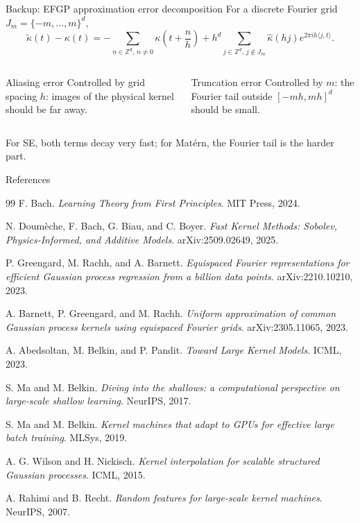 \documentclass[aspectratio=169,11pt]{ctexbeamer}
\begin{document}
\begin{frame}{Backup: EFGP approximation error decomposition}
\small
For a discrete Fourier grid $J_m=\{-m,\ldots,m\}^d$,
\[
\widetilde\kappa(t)-\kappa(t)=
-\sum_{n\in\mathbb{Z}^d,\,n\ne0}\kappa\left(t+\frac{n}{h}\right)
+ h^d\sum_{j\in\mathbb{Z}^d,\,j\notin J_m}\widehat\kappa(hj)e^{2\pi ih\langle j,t\rangle}.
\]
\begin{columns}[T,onlytextwidth]
\begin{block}{Aliasing error}
Controlled by grid spacing $h$: images of the physical kernel should be far away.
\end{block}
\begin{block}{Truncation error}
Controlled by $m$: the Fourier tail outside $[-mh,mh]^d$ should be small.
\end{block}
\end{columns}
\vspace{0.25cm}
\small For SE, both terms decay very fast; for Mat\'ern, the Fourier tail is the harder part.
\end{frame}

\begin{frame}[allowframebreaks]{References}
\tiny
\begin{thebibliography}{99}
F. Bach. \emph{Learning Theory from First Principles}. MIT Press, 2024.

N. Doum\`eche, F. Bach, G. Biau, and C. Boyer. \emph{Fast Kernel Methods: Sobolev, Physics-Informed, and Additive Models}. arXiv:2509.02649, 2025.

P. Greengard, M. Rachh, and A. Barnett. \emph{Equispaced Fourier representations for efficient Gaussian process regression from a billion data points}. arXiv:2210.10210, 2023.

A. Barnett, P. Greengard, and M. Rachh. \emph{Uniform approximation of common Gaussian process kernels using equispaced Fourier grids}. arXiv:2305.11065, 2023.

A. Abedsoltan, M. Belkin, and P. Pandit. \emph{Toward Large Kernel Models}. ICML, 2023.

S. Ma and M. Belkin. \emph{Diving into the shallows: a computational perspective on large-scale shallow learning}. NeurIPS, 2017.

S. Ma and M. Belkin. \emph{Kernel machines that adapt to GPUs for effective large batch training}. MLSys, 2019.

A. G. Wilson and H. Nickisch. \emph{Kernel interpolation for scalable structured Gaussian processes}. ICML, 2015.

A. Rahimi and B. Recht. \emph{Random features for large-scale kernel machines}. NeurIPS, 2007.
\end{thebibliography}
\end{frame}
\end{document}
